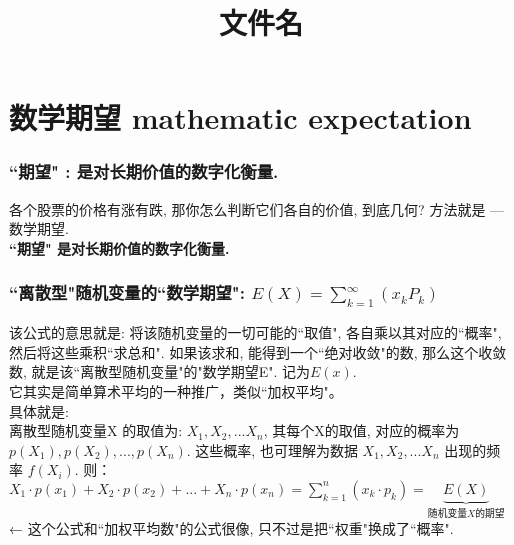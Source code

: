 \documentclass[UTF8]{ctexart}
\title{文件名}
\begin{document}
	\tableofcontents %
	\date{} %
	\maketitle  %
	
	
	\part{数学期望 mathematic expectation}
	
	\section{``期望" : 是对长期价值的数字化衡量.}
	
	各个股票的价格有涨有跌, 那你怎么判断它们各自的价值, 到底几何? 方法就是 --- 数学期望.  \\
	\textbf{``期望" 是对长期价值的数字化衡量.} \\
	
	
	
	
	
	\section{``离散型"随机变量的``数学期望": $E(X)= \sum_{k=1}^{\infty} (x_k P_k)$}
	
	该公式的意思就是: 将该随机变量的一切可能的``取值", 各自乘以其对应的``概率", 然后将这些乘积``求总和". 如果该求和, 能得到一个``绝对收敛"的数, 那么这个收敛数, 就是该``离散型随机变量"的"数学期望E". 记为$E(x)$. \\
	它其实是简单算术平均的一种推广，类似``加权平均"。\\
	
	具体就是: \\
	离散型随机变量X 的取值为: $ X_1, X_2, ... X_n$, 其每个X的取值, 对应的概率为 $ p(X_1), p(X_2),..., p(X_n)$. 这些概率, 也可理解为数据 $ X_1, X_2, ... X_n$ 出现的频率 $ f(X_i)$. 则： \\
	$\boxed{
	X_1\cdot p(x_1)+X_2\cdot p(x_2)+...+X_n\cdot p(x_n)=\sum_{k=1}^n{(x_k \cdot p_k)}=\underset{\text{随机变量}X\text{的期望}}{\underbrace{E(X)}}
	}$ \\
	← 这个公式和``加权平均数"的公式很像, 只不过是把``权重"换成了``概率". \\
	
\end{document}
